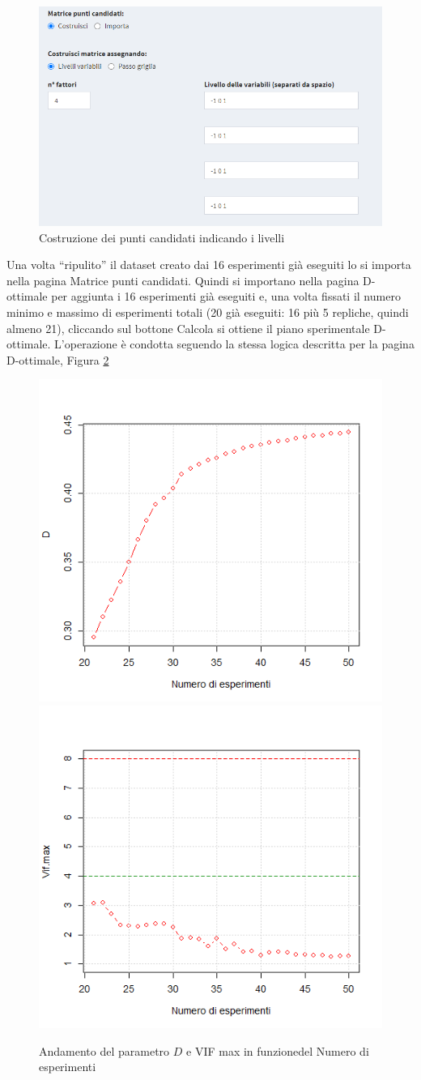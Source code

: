 \documentclass[
  11pt,
]{book}
\begin{document}
\begin{figure}[ht]

{\centering \includegraphics[width=1\linewidth]{Immagini/D_opt/10_es2} 

}

\caption{Costruzione dei punti candidati indicando i livelli}\label{fig:fig10}
\end{figure}

Una volta ``ripulito'' il dataset creato dai 16 esperimenti già eseguiti lo si importa nella pagina Matrice punti candidati. Quindi si importano nella pagina D-ottimale per aggiunta i 16 esperimenti già eseguiti e, una volta fissati il numero minimo e massimo di esperimenti totali (20 già eseguiti: 16 più 5 repliche, quindi almeno 21), cliccando sul bottone Calcola si ottiene il piano sperimentale D-ottimale. L'operazione è condotta seguendo la stessa logica descritta per la pagina D-ottimale, Figura \ref{fig:fig8}

\begin{figure}[ht]
\includegraphics[width=0.5\linewidth]{Immagini/D_opt/08_es2} \includegraphics[width=0.5\linewidth]{Immagini/D_opt/09_es2} \caption{Andamento del parametro $D$ e VIF max in funzionedel Numero di esperimenti}\label{fig:fig8}
\end{figure}
\end{document}
